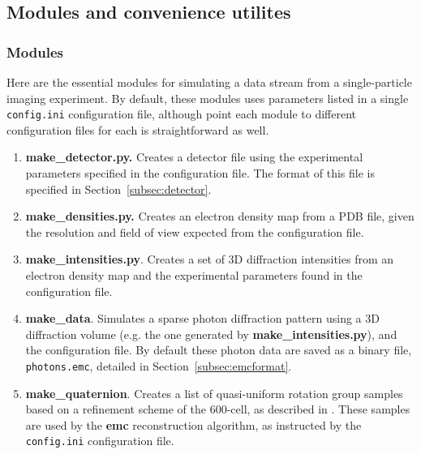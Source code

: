 \documentclass[]{iucr}              %
\begin{document}
\subsection{Modules and convenience utilites}
\label{subsec:mod+utils}
\subsubsection{Modules}
Here are the essential modules for simulating a data stream from a single-particle imaging experiment. By default, these modules uses parameters listed in a single \texttt{config.ini} configuration file, although point each module to different configuration files for each is straightforward as well.

\begin{enumerate}
\item{\bf make\_detector.py.} Creates a detector file using the experimental parameters specified in the configuration file. The format of this file is specified in Section~\ref{subsec:detector}.
\item{\bf make\_densities.py.} Creates an electron density map from a PDB file, given the resolution and field of view expected from the configuration file.
\item{\bf make\_intensities.py}. Creates a set of 3D diffraction intensities from an electron density map and the experimental parameters found in the configuration file.  
\item{\bf make\_data}. Simulates a sparse photon diffraction pattern using a 3D diffraction volume (e.g. the one generated by {\bf make\_intensities.py}), and the configuration file. By default these photon data are saved as a binary file, \texttt{photons.emc}, detailed in Section~\ref{subsec:emcformat}.
\item{\bf make\_quaternion}. Creates a list of quasi-uniform rotation group samples based on a refinement scheme of the 600-cell, as described in . These samples are used by the {\bf emc} reconstruction algorithm, as instructed by the \texttt{config.ini} configuration file.
\end{enumerate}
\end{document}
